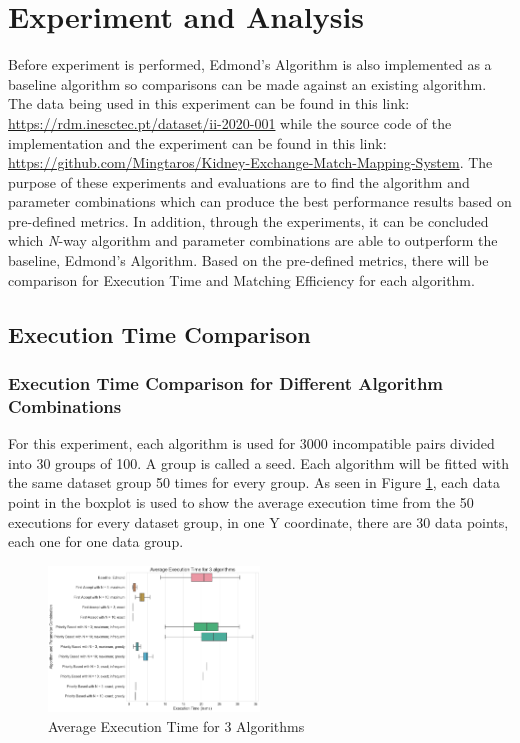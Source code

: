 \documentclass[conference]{IEEEtran}
\begin{document}
\section{Experiment and Analysis}
Before experiment is performed, Edmond's Algorithm is also implemented as a baseline algorithm so comparisons can be made against
an existing algorithm. The data being used in this experiment can be found in this link: \url{https://rdm.inesctec.pt/dataset/ii-2020-001}
while the source code of the implementation and the experiment can be found in this link: \url{https://github.com/Mingtaros/Kidney-Exchange-Match-Mapping-System}.
The purpose of these experiments and evaluations are to find the algorithm and parameter combinations which can produce the best
performance results based on pre-defined metrics. In addition, through the experiments, it can be concluded which \textit{N}-way
algorithm and parameter combinations are able to outperform the baseline, Edmond's Algorithm. Based on the pre-defined metrics,
there will be comparison for Execution Time and Matching Efficiency for each algorithm.

\subsection{Execution Time Comparison}
\subsubsection{Execution Time Comparison for Different Algorithm Combinations}
For this experiment, each algorithm is used for 3000 incompatible pairs divided into 30 groups of 100. A group is called a seed. Each
algorithm will be fitted with the same dataset group 50 times for every group. As seen in Figure \ref{exctimealgo}, each data point in the boxplot
is used to show the average execution time from the 50 executions for every dataset group, in one Y coordinate, there are 30 data
points, each one for one data group. 

\begin{figure}[h]
    \includegraphics[width=0.5\textwidth]{images/average_execution_time_for_3_algorithms.png}
    \caption{Average Execution Time for 3 Algorithms}
    \label{exctimealgo}
\end{figure}
\end{document}
